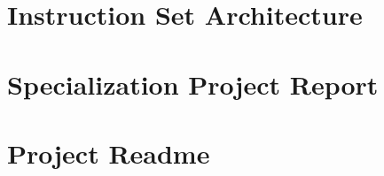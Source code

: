 \appendix



\chapter{Instruction Set Architecture}
\label{app:isa}
\cleardoublepage


\chapter{Specialization Project Report}
\label{app:spec-proj-report}


\cleardoublepage
\chapter{Project Readme}
\label{app:readme}




